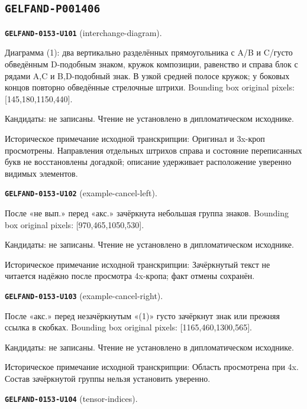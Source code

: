 \subsection*{\texttt{GELFAND-P001406}}
\par\noindent\leavevmode{}\label{GELFAND-0153-U101}\textbf{\texttt{GELFAND-0153-U101}} (interchange-diagram).\nopagebreak[4]\par
Диаграмма (1): два вертикально разделённых прямоугольника с A/B и C/густо обведённым D-подобным знаком, кружок композиции, равенство и справа блок с рядами A,C и B,D-подобный знак. В узкой средней полосе кружок; у боковых концов повторно обведённые стрелочные штрихи. Bounding box original pixels: [145,180,1150,440].\par
Кандидаты: не записаны. Чтение не установлено в дипломатическом исходнике.\par
Историческое примечание исходной транскрипции: Оригинал и 3x-кроп просмотрены. Направления отдельных штрихов справа и состояние переписанных букв не восстановлены догадкой; описание удерживает расположение уверенно видимых элементов.\par\medskip
\par\noindent\leavevmode{}\label{GELFAND-0153-U102}\textbf{\texttt{GELFAND-0153-U102}} (example-cancel-left).\nopagebreak[4]\par
После «не вып.» перед «акс.» зачёркнута небольшая группа знаков. Bounding box original pixels: [970,465,1050,530].\par
Кандидаты: не записаны. Чтение не установлено в дипломатическом исходнике.\par
Историческое примечание исходной транскрипции: Зачёркнутый текст не читается надёжно после просмотра 4x-кропа; факт отмены сохранён.\par\medskip
\par\noindent\leavevmode{}\label{GELFAND-0153-U103}\textbf{\texttt{GELFAND-0153-U103}} (example-cancel-right).\nopagebreak[4]\par
После «акс.» перед незачёркнутым «(1)» густо зачёркнут знак или прежняя ссылка в скобках. Bounding box original pixels: [1165,460,1300,565].\par
Кандидаты: не записаны. Чтение не установлено в дипломатическом исходнике.\par
Историческое примечание исходной транскрипции: Область просмотрена при 4x. Состав зачёркнутой группы нельзя установить уверенно.\par\medskip
\par\noindent\leavevmode{}\label{GELFAND-0153-U104}\textbf{\texttt{GELFAND-0153-U104}} (tensor-indices).\nopagebreak[4]\par
